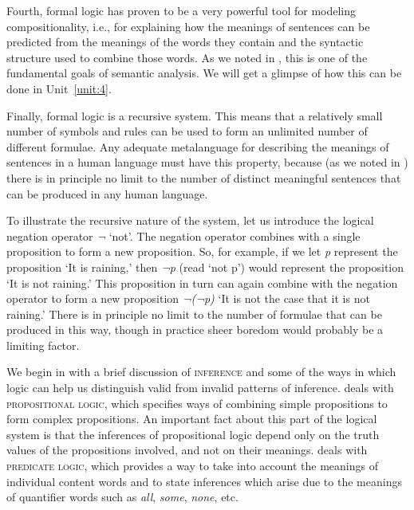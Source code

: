 Fourth, formal logic has proven to be a very powerful tool for modeling compositionality, i.e., for explaining how the meanings of sentences can be predicted from the meanings of the words they contain and the syntactic structure used to combine those words. As we noted in , this is one of the fundamental goals of semantic analysis. We will get a glimpse of how this can be done in Unit~\ref{unit:4}.



Finally, formal logic is a recursive system. This means that a relatively small number of symbols and rules can be used to form an unlimited number of different formulae. Any adequate metalanguage for describing the meanings of sentences in a human language must have this property, because (as we noted in ) there is in principle no limit to the number of distinct meaningful sentences that can be produced in any human language.



To illustrate the recursive nature of the system, let us introduce the logical negation operator \textit{¬} ‘not’. The negation operator combines with a single proposition to form a new proposition. So, for example, if we let \textit{p} represent the proposition ‘It is raining,’ then \textit{¬p} (read ‘not p’) would represent the proposition ‘It is not raining.’ This proposition in turn can again combine with the negation operator to form a new proposition \textit{¬(¬p)} ‘It is not the case that it is not raining.’ There is in principle no limit to the number of formulae that can be produced in this way, though in practice sheer boredom would probably be a limiting factor.



We begin in  with a brief discussion of \textsc{inference} and some of the ways in which logic can help us distinguish valid from invalid patterns of inference.  deals with \textsc{propositional logic}, which specifies ways of combining simple propositions to form complex propositions. An important fact about this part of the logical system is that the inferences of propositional logic depend only on the truth values of the propositions involved, and not on their meanings.  deals with \textsc{predicate logic}, which provides a way to take into account the meanings of individual content words and to state inferences which arise due to the meanings of quantifier words such as \textit{all}, \textit{some}, \textit{none}, etc.


